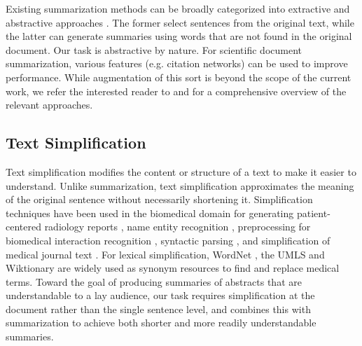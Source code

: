\documentclass[letterpaper, table]{article} %
\begin{document}
Existing summarization methods can be broadly categorized into extractive and abstractive approaches \cite{Andr2007ASO}. The former \cite{Erkan2004LexRankGC, Cheng2016NeuralSB} select sentences from the original text, while the latter \cite{rush2015abstractive, nallapati2016abstractive} can generate summaries using words that are not found in the original document. Our task is abstractive by nature. For scientific document summarization, various features (e.g. citation networks) can be used to improve performance. While augmentation of this sort is beyond the scope of the current work, we refer the interested reader to \citet{Altmami2020AutomaticSO} and \citet{ Moradi2019TextSI} for a  comprehensive overview of the relevant approaches.
\subsection{Text Simplification}
Text simplification \cite{Shardlow2014ASO} modifies the content or structure of a text to make it easier to understand. Unlike summarization, text simplification approximates the meaning of the original sentence without necessarily shortening it.
Simplification techniques have been used in the biomedical domain for generating patient-centered radiology reports \cite{qenam2017text}, name entity recognition \cite{habibi2017deep}, preprocessing for biomedical interaction recognition \cite{baumgartner2008concept}, syntactic parsing \cite{jonnalagadda2010towards}, and simplification of medical journal text \cite{jonnalagadda2010towards}. For lexical simplification, WordNet \cite{miller1995wordnet}, the UMLS \cite{bodenreider2004unified} and Wiktionary \cite{zesch2008extracting} are widely used as synonym resources to find and replace medical terms. Toward the goal of producing summaries of abstracts that are understandable to a lay audience, our task requires simplification at the document rather than the single sentence level, and combines this with summarization to achieve both shorter and more readily
understandable summaries.
\end{document}

